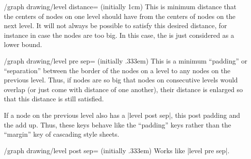 \begin{key}{/graph drawing/level distance= (initially 1cm)}
  This is minimum distance that the centers of nodes on one
  level should have from the centers of nodes on the next level. It
  will not always be possible to satisfy this desired distance, for
  instance in case the nodes are too big. In this case, the
   is just considered as a lower bound.
\begin{codeexample}[]
\end{codeexample}
\end{key}

\begin{key}{/graph drawing/level pre sep= (initially .333em)}
  This is a minimum ``padding'' or ``separation'' between the border
  of the nodes on a level to any nodes on the previous level. Thus, if
  nodes are so big that nodes on consecutive levels would overlap (or
  just come with  distance of one another), their
  distance is enlarged so that this distance is still satisfied.

  If a node on the previous level also has a |level post sep|, this
  post padding and the  add up. Thus, these keys
  behave like the ``padding'' keys rather
  than the ``margin'' key of cascading style sheets.
  
\begin{codeexample}[]
\end{codeexample}
\end{key}

\begin{key}{/graph drawing/level post sep= (initially .333em)}
  Works like |level pre sep|.
\end{key}

